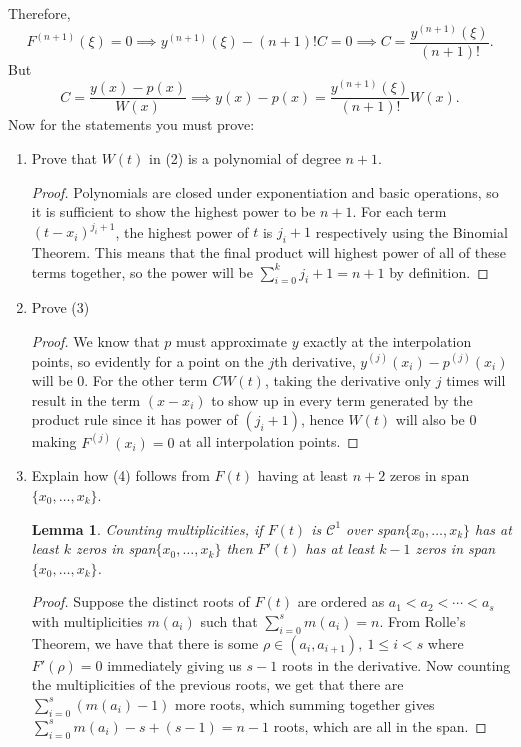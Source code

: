 \documentclass{article}
\newtheorem*{lemma}{Lemma}
\begin{document}
\begin{enumerate}
        Therefore,
            \[ F^{(n+1)}(\xi) = 0 \implies y^{(n+1)}(\xi) - (n+1)!C = 0 \implies C = \frac{y^{(n+1)}(\xi)}{(n+1)!}. \] 
        But
            \[ C = \frac{y(x) - p(x)}{W(x)} \implies y(x) - p(x) = \frac{y^{(n+1)}(\xi)}{(n+1)!}W(x). \]
        Now for the statements you must prove:
        \begin{enumerate}
            \item Prove that $W(t)$ in (2) is a polynomial of degree $n+1$.
                \begin{proof}
                Polynomials are closed under exponentiation and basic operations, so it is sufficient to show the highest power to be $n+1$. For each term $(t - x_i)^{j_i + 1}$, the highest power of $t$ is $j_i + 1$ respectively using the Binomial Theorem. This means that the final product will highest power of all of these terms together, so the power will be $\sum_{i=0}^{k}j_i + 1 = n + 1$ by definition.
                \end{proof}
            \item Prove (3)
                \begin{proof}
                    We know that $p$ must approximate $y$ exactly at the interpolation points, so evidently for a point on the $j$th derivative, $y^{(j)}(x_i) - p^{(j)}(x_i)$ will be 0. For the other term $CW(t)$, taking the derivative only $j$ times will result in the term $(x - x_i)$ to show up in every term generated by the product rule since it has power of $(j_i + 1)$, hence $W(t)$ will also be 0 making $F^{(j)}(x_i) = 0$ at all interpolation points.
                \end{proof}
            \item Explain how (4) follows from $F(t)$ having at least $n+2$ zeros in span$\{x_0,\dots,x_k\}$.
                \begin{lemma}
                    Counting multiplicities, if $F(t)$ is $\mathcal C^1$ over span$\{x_0,\dots,x_k\}$ has at least $k$ zeros in span$\{x_0,\dots,x_k\}$ then $F'(t)$ has at least $k-1$ zeros in span$\{x_0,\dots,x_k\}$.
                \end{lemma}
                \begin{proof}
                    Suppose the distinct roots of $F(t)$ are ordered as $a_1 < a_2 < \cdots < a_s$ with multiplicities $m(a_i)$ such that $\sum_{i=0}^s m(a_i) = n$. From Rolle's Theorem, we have that there is some $\rho \in (a_i, a_{i+1}),\: 1\leq i < s$ where $F'(\rho) = 0$ immediately giving us $s - 1$ roots in the derivative. Now counting the multiplicities of the previous roots, we get that there are $\sum_{i=0}^s (m(a_i) - 1)$ more roots, which summing together gives $\sum_{i=0}^s m(a_i) - s + (s - 1) = n - 1$ roots, which are all in the span.

\end{proof}
\end{enumerate}
\end{enumerate}
\end{document}
